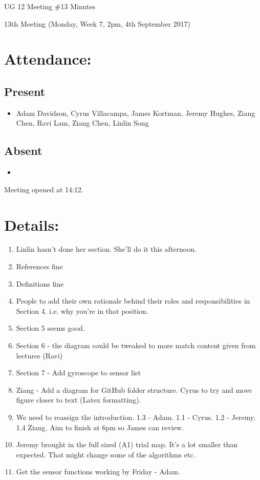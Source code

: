 \documentclass{article}
\begin{document}
\begin{adjustwidth}{2.5em}{0pt}
\begin{center}
\Large{UG 12 Meeting \#13 Minutes}\\
\end{center}
\end{adjustwidth}


13th Meeting (Monday, Week 7, 2pm, 4th September 2017)
\section{Attendance:}
\subsection*{Present}
\begin{itemize}
\item Adam Davidson, Cyrus Villacampa, James Kortman, Jeremy Hughes, Ziang Chen, Ravi Lam, Ziang Chen, Linlin Song
\end{itemize}
\subsection*{Absent}
\begin{itemize}
\item 
\end {itemize}

Meeting opened at 14:12.
\section{Details:}
\begin{enumerate}
\subsection{SPMP Draft}
\item Linlin hasn’t done her section. She’ll do it this afternoon.
\item References fine
\item Definitions fine
\item People to add their own rationale behind their roles and responsibilities in Section 4. i.e. why you’re in that position.
\item Section 5 seems good.
\item Section 6 - the diagram could be tweaked to more match content given from lectures (Ravi)
\item Section 7 - Add gyroscope to sensor list
\item Ziang - Add a diagram for GitHub folder structure. Cyrus to try and move figure closer to text (Latex formatting).
\item We need to reassign the introduction. 1.3 - Adam. 1.1 - Cyrus. 1.2 - Jeremy. 1.4 Ziang. Aim to finish at 6pm so James can review.

\item Jeremy brought in the full sized (A1) trial map. It's a lot smaller than expected. That might change some of the algorithms etc.
\item Get the sensor functions working by Friday - Adam.
\end{enumerate}
\end{document}
